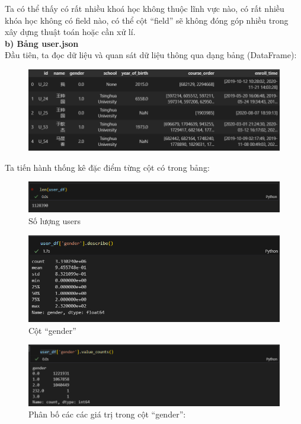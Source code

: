 \newpage
Ta có thể thấy có rất nhiều khoá học không thuộc lĩnh vực nào, có rất nhiều khóa học không có field nào, có thể cột “field” sẽ không đóng góp nhiều trong xây dựng thuật toán hoặc cần xử lí.\\
\textbf{b) Bảng user.json}\\
Đầu tiên, ta đọc dữ liệu và quan sát dữ liệu thông qua dạng bảng (DataFrame):
\begin{figure}[h]
    \centering
    \includegraphics[width=1\linewidth]{figures/15.png}
\end{figure}
\newpage
Ta tiến hành thống kê đặc điểm từng cột có trong bảng:
\begin{figure}[h]
    \centering
    \includegraphics[width=1\linewidth]{figures/16.png}
    \caption{Số lượng users}
\end{figure}
\begin{figure}[h]
    \centering
    \includegraphics[width=1\linewidth]{figures/17.png}
    \caption{Cột “gender”}
\end{figure}
\begin{figure}[h]
    \centering
    \includegraphics[width=1\linewidth]{figures/18.png}
    \caption{Phân bố các các giá trị trong cột “gender”:}
\end{figure}
